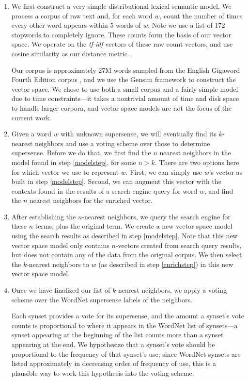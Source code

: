 \documentclass{article}
\begin{document}
\begin{enumerate}
\item\label{modelstep}
We first construct a very simple distributional lexical semantic model.
We process a corpus of raw text and, for each word $w$, count the number of times every other word appears within 5 words of $w$.
Note we use a list of 172 stopwords to completely ignore.
These counts form the basis of our vector space.
We operate on the {\it tf-idf} vectors of these raw count vectors, and use cosine similarity as our distance metric.

Our corpus is approximately 27M words sampled from the English Gigaword Fourth Edition corpus \cite{gigaword}, and we use the Gensim framework \cite{gensim} to construct the vector space.
We chose to use both a small corpus and a fairly simple model due to time constraints---it takes a nontrivial amount of time and disk space to handle larger corpora, and vector space models are not the focus of the current work.

\item \label{enrichstep}
Given a word $w$ with unknown supersense, we will eventually find its $k$-nearest neighbors and use a voting scheme over those to determine supersense.
Before we do that, we first find the $n$ nearest neighbors in the model found in step \ref{modelstep}, for some $n > k$.
There are two options here for which vector we use to represent $w$.
First, we can simply use $w$'s vector as built in step \ref{modelstep}.
Second, we can augment this vector with the contexts found in the results of a search engine query for word $w$, and find the $n$ nearest neighbors for the enriched vector.

\item \label{refinestep}
After establishing the $n$-nearest neighbors, we query the search engine for these $n$ terms, plus the original term. 
We create a new vector space model using the search results as described in step \ref{modelstep}. 
Note that this new vector space model only contains $n$-vectors created from search query results, but does not contain any of the data from the original corpus. 
We then select the $k$-nearest neighbors to $w$ (as described in step \ref{enrichstep}) in this new vector space model.

\item
\label{item:voting}
Once we have finalized our list of $k$-nearest neighbors, we apply a voting scheme over the WordNet supersense labels of the neighbors.

Each synset provides a vote for its supersense, and the amount a synset's vote counts is proportional to where it appears in the WordNet list of synsets---a synset appearing at the beginning of the list counts more than a synset appearing at the end.
We hypothesize that a synset's vote should be proportional to the frequency of that synset's use; since WordNet synsets are listed approximately in decreasing order of frequency of use, this is a plausible way to work this hypothesis into the voting scheme.


\end{enumerate}
\end{document}
